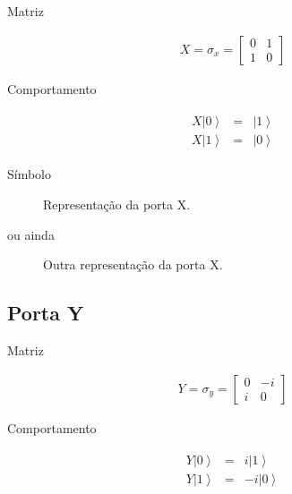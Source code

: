 Matriz

\[\begin{aligned}
X = \sigma_x =
\begin{bmatrix}
    0 & 1 \\
    1 & 0
\end{bmatrix}
\end{aligned}\]

Comportamento

\[\begin{aligned}
\begin{matrix}
    X \left| 0 \right\rangle &=& \left| 1 \right\rangle \\
    X \left| 1 \right\rangle &=& \left| 0 \right\rangle
\end{matrix}
\end{aligned}\]

Símbolo

\begin{figure}[!htp]
    \centering
    
    \caption{Representação da porta X.}
    \label{fig:xgate}
\end{figure}

ou ainda

\begin{figure}[!htp]
    \centering
    
    \caption{Outra representação da porta X.}
    \label{fig:targ-gate}
\end{figure}


\subsection{Porta Y}\label{subsec:porta-y}

Matriz

\[\begin{aligned}
Y = \sigma_y =
\begin{bmatrix}
    0 & -i \\
    i & 0
\end{bmatrix}
\end{aligned}\]

Comportamento

\[\begin{aligned}
\begin{matrix}
    Y \left| 0 \right\rangle &=& i\left| 1 \right\rangle \\
    Y \left| 1 \right\rangle &=& -i\left| 0 \right\rangle
\end{matrix}
\end{aligned}\]

